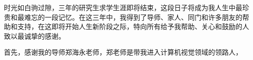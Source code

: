 \begin{acknowledgement}
时光如白驹过隙，三年的研究生求学生涯即将结束，这段日子将成为我人生中最珍贵和最难忘的一段记忆。在这三年中，我得到了导师、家人、同门和许多朋友的帮助和支持，在这即将开始人生新阶段之际，特向所有给予我帮助、关心和鼓励的人致以最诚挚的感谢。

首先，感谢我的导师郑海永老师，郑老师是带我进入计算机视觉领域的领路人，

\end{acknowledgement}
